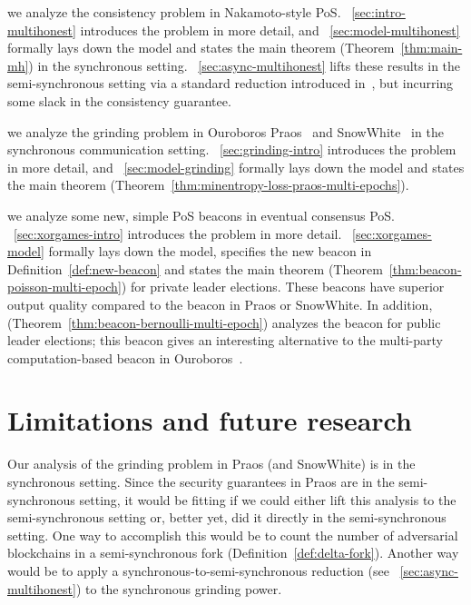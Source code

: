\begin{description}[font=\normalfont\ ]
  \item[In Part~\ref{part:multihonest},]
    we analyze the consistency problem in Nakamoto-style PoS.
    \Section~\ref{sec:intro-multihonest} introduces the problem in more detail, 
    and \Section~\ref{sec:model-multihonest} formally lays down the model and 
    states the main theorem (Theorem~\ref{thm:main-mh}) in the synchronous setting.
    \Section~\ref{sec:async-multihonest} lifts these results in the semi-synchronous setting 
    via a standard reduction introduced in~\cite{Praos}, 
    but incurring some slack in the consistency guarantee. 
  
  \item[In Part~\ref{part:praos},]
    we analyze the grinding problem in Ouroboros Praos~\cite{Praos} and SnowWhite~\cite{SnowWhite} 
    in the synchronous communication setting.
    \Section~\ref{sec:grinding-intro} introduces the problem in more detail, 
    and \Section~\ref{sec:model-grinding} formally lays down the model and 
    states the main theorem (Theorem~\ref{thm:minentropy-loss-praos-multi-epochs}). 

  \item[In Part~\ref{part:xorgames},]
    we analyze some new, simple PoS beacons in eventual consensus PoS. 
    \Section~\ref{sec:xorgames-intro} introduces the problem in more detail. 
    \Section~\ref{sec:xorgames-model} formally lays down the model, 
    specifies the new beacon in Definition~\ref{def:new-beacon} and 
    states the main theorem (Theorem~\ref{thm:beacon-poisson-multi-epoch}) 
    for private leader elections.
    These beacons have superior output quality compared to the beacon in Praos or SnowWhite. 
    In addition, (Theorem~\ref{thm:beacon-bernoulli-multi-epoch}) 
    analyzes the beacon for public leader elections; 
    this beacon gives an interesting alternative to the multi-party computation-based 
    beacon in Ouroboros~\cite{Ouroboros}.
\end{description}




\section{Limitations and future research}
Our analysis of the grinding problem in Praos (and SnowWhite) 
is in the synchronous setting. 
Since the security guarantees in Praos are in the semi-synchronous setting, 
it would be fitting if we could either lift this analysis to the semi-synchronous setting 
or, better yet, did it directly in the semi-synchronous setting. 
One way to accomplish this would be to 
count the number of adversarial blockchains in a semi-synchronous fork (Definition~\ref{def:delta-fork}). 
Another way would be to apply a synchronous-to-semi-synchronous reduction (see \Section~\ref{sec:async-multihonest})
to the synchronous grinding power.

